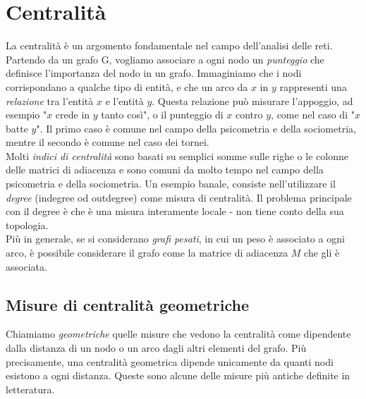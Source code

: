 \section{Centralità}
La centralità è un argomento fondamentale nel campo dell'analisi delle reti. Partendo da un grafo G, vogliamo associare a ogni nodo un \textit{punteggio} che definisce l'importanza del nodo in un grafo. Immaginiamo che i nodi corrispondano a qualche tipo di entità, e che un arco da $x$ in $y$ rappresenti una \textit{relazione} tra l'entità $x$ e l'entità $y$. Questa relazione può misurare l'appoggio, ad esempio "$x$ crede in $y$ tanto così", o il punteggio di $x$ contro $y$, come nel caso di "$x$ batte $y$". Il primo caso è comune nel campo della psicometria e della sociometria, mentre il secondo è comune nel caso dei tornei.\\
Molti \textit{indici di centralità} sono basati su semplici somme sulle righe o le colonne delle matrici di adiacenza e sono comuni da molto tempo nel campo della psicometria e della sociometria. Un esempio banale, consiste nell'utilizzare il \textit{degree} (indegree od outdegree) come misura di centralità. Il problema principale con il degree è che è una misura interamente locale - non tiene conto della sua topologia.\\
Più in generale, se si considerano \textit{grafi pesati}, in cui un peso è associato a ogni arco, è possibile considerare il grafo come la matrice di adiacenza $M$ che gli è associata.
\subsection{Misure di centralità geometriche}
Chiamiamo \textit{geometriche} quelle misure che vedono la centralità come dipendente dalla distanza di un nodo o un arco dagli altri elementi del grafo. Più precisamente, una centralità geometrica dipende unicamente da quanti nodi esistono a ogni distanza. Queste sono alcune delle misure più antiche definite in letteratura.
